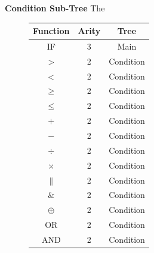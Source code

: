 \documentclass[a4paper,12pt]{article}
\begin{document}
{                \noindent \textbf{Condition Sub-Tree} \newline 
                The 
                \begin{figure}[h!]
                    \begin{minipage}[c]{0.5\textwidth}
                        \centering
                        \begin{tabular}{|c|c|c|}
                            \hline
                            \textbf{Function} & \textbf{Arity} & \textbf{Tree}\\
                            \hline
                            IF & 3 & Main  \\
                            \hline 
                            $>$ & 2 & Condition \\
                            \hline
                            $<$ & 2 & Condition \\
                            \hline
                            $\geq$ & 2 & Condition \\
                            \hline
                            $\leq$ & 2 & Condition \\
                            \hline
                            $+$ & 2 & Condition \\
                            \hline
                            $-$ & 2 & Condition \\
                            \hline
                            $\div$ & 2 & Condition \\
                            \hline
                            $\times$ & 2 & Condition \\
                            \hline
                            $\|$ & 2 & Condition \\
                            \hline
                            $\&$ & 2 & Condition \\
                            \hline
                            $\oplus$ & 2 & Condition \\
                            \hline
                            $\text{OR}$ & 2 & Condition \\
                            \hline
                            $\text{AND}$ & 2 & Condition \\
                            \hline
                        \end{tabular}
                    \end{minipage}

\end{figure}}
\end{document}
